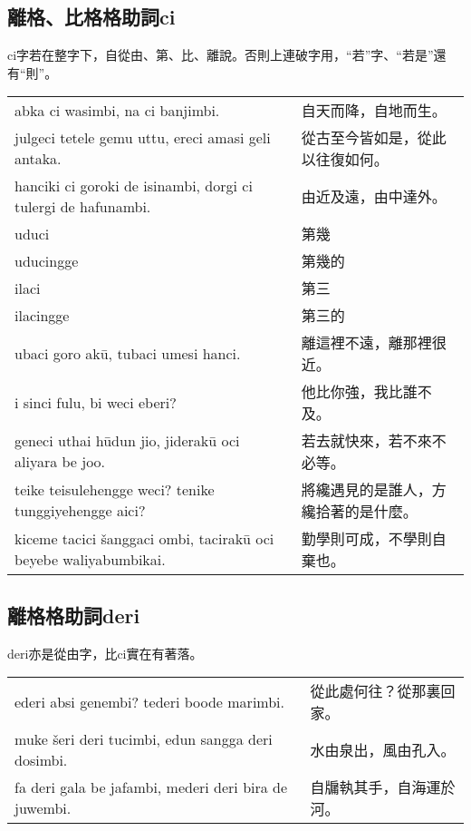 \documentclass{article}
\begin{document}
\subsection{離格、比格格助詞ci}
\noindent ci字若在整字下，自從由、第、比、離說。否則上連破字用，``若''字、``若是''還有``則''。
\begin{center}
    \begin{tabularx}{\textwidth}{XX}
     abka ci wasimbi, na ci banjimbi.&自天而降，自地而生。\\
     julgeci tetele gemu uttu, ereci amasi geli antaka.&從古至今皆如是，從此以往復如何。\\
     hanciki ci goroki de isinambi, dorgi ci tulergi de hafunambi.&由近及遠，由中達外。\\
     uduci & 第幾\\ uducingge& 第幾的\\ilaci&第三\\ilacingge&第三的\\
     ubaci goro ak\={u}, tubaci umesi hanci.&離這裡不遠，離那裡很近。\\
     i sinci fulu, bi weci eberi? &他比你強，我比誰不及。\\
     geneci uthai h\={u}dun jio, jiderak\={u} oci aliyara be joo.&若去就快來，若不來不必等。\\
     teike teisulehengge weci? tenike tunggiyehengge aici?&將纔遇見的是誰人，方纔拾著的是什麼。\\
     kiceme tacici \v{s}anggaci ombi, tacirak\={u} oci beyebe waliyabumbikai. &勤學則可成，不學則自棄也。
    \end{tabularx}
\end{center}

\subsection{離格格助詞deri}
\noindent deri亦是從由字，比ci實在有著落。
\begin{center}
    \begin{tabularx}{\textwidth}{XX}
     ederi absi genembi? tederi boode marimbi.&從此處何往？從那裏回家。\\
     muke \v{s}eri deri tucimbi, edun sangga deri dosimbi.&水由泉出，風由孔入。\\
     fa deri gala be jafambi, mederi deri bira de juwembi.&自牖執其手，自海運於河。
    \end{tabularx}
\end{center}
\end{document}
